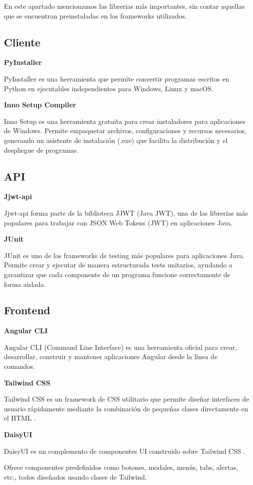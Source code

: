 En este apartado mencionamos las librerias más importantes, sin contar aquellas que se encuentran preinstaladas en los
frameworks utilizados.

\subsection{Cliente}\label{subsec:librerias_cliente}

\textbf{PyInstaller}

PyInstaller\cite{pyinstaller:official} es una herramienta que permite convertir programas escritos en Python en ejecutables independientes para
Windows, Linux y macOS.


\textbf{Inno Setup Compiler}

Inno Setup\cite{innosetup:official} es una herramienta gratuita para crear instaladores para aplicaciones de Windows.
Permite empaquetar archivos, configuraciones y recursos necesarios, generando un asistente de instalación (.exe) que
facilita la distribución y el despliegue de programas.

\subsection{API}\label{subsec:librerias_api}


\textbf{Jjwt-api}

Jjwt-api forma parte de la biblioteca JJWT (Java JWT)\cite{jjwt:official}, una de las librerías más populares para trabajar con
JSON Web Tokens (JWT) en aplicaciones Java.


\textbf{JUnit}

JUnit\cite{junit:official} es uno de los frameworks de testing más populares para aplicaciones Java.
Permite crear y ejecutar de manera estructurada tests unitarios, ayudando a garantizar que cada componente de un
programa funcione correctamente de forma aislada.


\subsection{Frontend}\label{subsec:librerias_frontend}



\textbf{Angular CLI}

Angular CLI (Command Line Interface)\cite{angularcli:official} es una herramienta oficial para crear, desarrollar,
construir y mantener aplicaciones Angular desde la línea de comandos.


\textbf{Tailwind CSS}

Tailwind CSS\cite{tailwind:official} es un framework de CSS utilitario que permite diseñar interfaces de usuario
rápidamente mediante la combinación de pequeñas clases directamente en el HTML .


\textbf{DaisyUI}

DaisyUI\cite{daisyui:official} es un complemento de componentes UI construido sobre Tailwind CSS .

Ofrece componentes predefinidos como botones, modales, menús, tabs, alertas, etc., todos diseñados usando clases de Tailwind.




